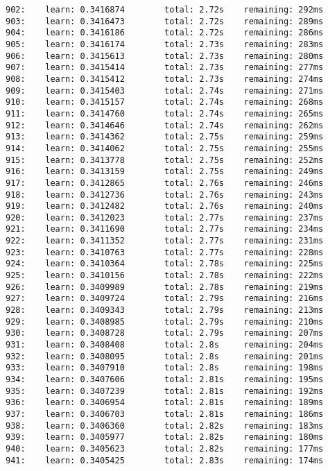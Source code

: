 \documentclass[11pt]{article}
\begin{document}
\begin{Verbatim}[commandchars=\\\{\}]
902:    learn: 0.3416874        total: 2.72s    remaining: 292ms
903:    learn: 0.3416473        total: 2.72s    remaining: 289ms
904:    learn: 0.3416186        total: 2.72s    remaining: 286ms
905:    learn: 0.3416174        total: 2.73s    remaining: 283ms
906:    learn: 0.3415613        total: 2.73s    remaining: 280ms
907:    learn: 0.3415414        total: 2.73s    remaining: 277ms
908:    learn: 0.3415412        total: 2.73s    remaining: 274ms
909:    learn: 0.3415403        total: 2.74s    remaining: 271ms
910:    learn: 0.3415157        total: 2.74s    remaining: 268ms
911:    learn: 0.3414760        total: 2.74s    remaining: 265ms
912:    learn: 0.3414646        total: 2.74s    remaining: 262ms
913:    learn: 0.3414362        total: 2.75s    remaining: 259ms
914:    learn: 0.3414062        total: 2.75s    remaining: 255ms
915:    learn: 0.3413778        total: 2.75s    remaining: 252ms
916:    learn: 0.3413159        total: 2.75s    remaining: 249ms
917:    learn: 0.3412865        total: 2.76s    remaining: 246ms
918:    learn: 0.3412736        total: 2.76s    remaining: 243ms
919:    learn: 0.3412482        total: 2.76s    remaining: 240ms
920:    learn: 0.3412023        total: 2.77s    remaining: 237ms
921:    learn: 0.3411690        total: 2.77s    remaining: 234ms
922:    learn: 0.3411352        total: 2.77s    remaining: 231ms
923:    learn: 0.3410763        total: 2.77s    remaining: 228ms
924:    learn: 0.3410364        total: 2.78s    remaining: 225ms
925:    learn: 0.3410156        total: 2.78s    remaining: 222ms
926:    learn: 0.3409989        total: 2.78s    remaining: 219ms
927:    learn: 0.3409724        total: 2.79s    remaining: 216ms
928:    learn: 0.3409343        total: 2.79s    remaining: 213ms
929:    learn: 0.3408985        total: 2.79s    remaining: 210ms
930:    learn: 0.3408728        total: 2.79s    remaining: 207ms
931:    learn: 0.3408408        total: 2.8s     remaining: 204ms
932:    learn: 0.3408095        total: 2.8s     remaining: 201ms
933:    learn: 0.3407910        total: 2.8s     remaining: 198ms
934:    learn: 0.3407606        total: 2.81s    remaining: 195ms
935:    learn: 0.3407239        total: 2.81s    remaining: 192ms
936:    learn: 0.3406954        total: 2.81s    remaining: 189ms
937:    learn: 0.3406703        total: 2.81s    remaining: 186ms
938:    learn: 0.3406360        total: 2.82s    remaining: 183ms
939:    learn: 0.3405977        total: 2.82s    remaining: 180ms
940:    learn: 0.3405623        total: 2.82s    remaining: 177ms
941:    learn: 0.3405425        total: 2.83s    remaining: 174ms

\end{Verbatim}
\end{document}
